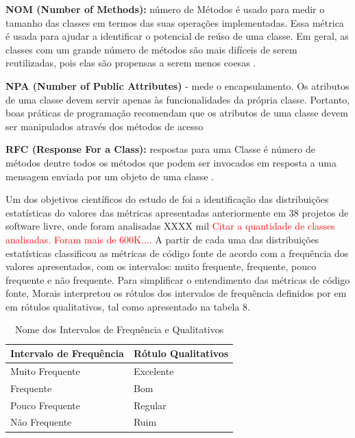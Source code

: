  \vspace{\onelineskip} 

\textbf{NOM (Number of Methods):} número de Métodos é usado para medir o tamanho
das classes em termos das suas operações implementadas. Essa métrica é usada para
ajudar a identificar o potencial de reúso de uma classe. Em geral, as classes com
um grande número de métodos são mais difíceis de serem reutilizadas, pois elas são
propensas a serem menos coesas \cite{Lorenz94}.


 \vspace{\onelineskip} 

\textbf{NPA (Number of Public Attributes)} - mede o encapsulamento. Os atributos de uma classe devem servir apenas às funcionalidades da própria classe. Portanto, boas práticas de programação recomendam que os atributos de uma classe devem ser manipulados através dos métodos de acesso \cite{beck1997smalltalk}



 \vspace{\onelineskip} 

\textbf{RFC (Response For a Class):} respostas para uma Classe é número de métodos
dentre todos os métodos que podem ser invocados em resposta a uma mensagem
enviada por um objeto de uma classe \cite{Sharble93}.



 \vspace{\onelineskip} 

Um dos objetivos científicos do estudo de  foi a identificação das distribuições estatísticas do valores das métricas apresentadas anteriormente em 38 projetos de software livre, onde foram analisadas XXXX mil \textcolor{red}{Citar a quantidade de classes analisadas. Foram mais de 600K...}. A partir de cada uma das distribuições estatísticas  classificou as métricas de código fonte de acordo com a frequência dos valores apresentados,
com os intervalos: muito frequente, frequente, pouco frequente e não frequente. Para simplificar o entendimento das métricas de código fonte, Morais interpretou os rótulos dos
intervalos de frequência definidos por  em em rótulos qualitativos, tal como apresentado na tabela 8. 

\begin{table}[!ht]
	\begin{center}
	 \begin{tabular}{|l|l|}
		\hline
		\textbf{Intervalo de Frequência} & \textbf{Rótulo Qualitativos} \\ \hline
		Muito Frequente & Excelente \\ \hline
		Frequente       & Bom       \\ \hline
		Pouco Frequente & Regular   \\ \hline
		Não Frequente   & Ruim      \\ \hline
		\end{tabular}
		\caption{Nome dos Intervalos de Frequência e Qualitativos}
		\label{nomes}
		\end{center}
		\end{table}


